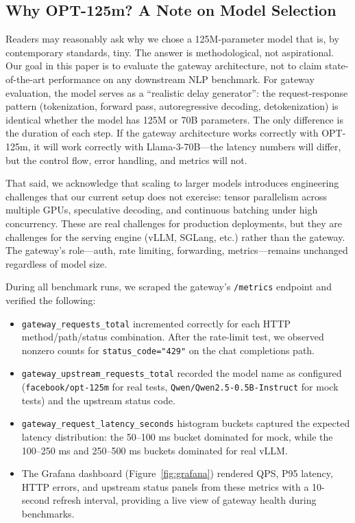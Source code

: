 \documentclass[10pt,journal]{IEEEtran}
\begin{document}
\subsection{Why OPT-125m? A Note on Model Selection}

Readers may reasonably ask why we chose a 125M-parameter model that is, by contemporary standards, tiny. The answer is methodological, not aspirational. Our goal in this paper is to evaluate the gateway architecture, not to claim state-of-the-art performance on any downstream NLP benchmark. For gateway evaluation, the model serves as a ``realistic delay generator'': the request-response pattern (tokenization, forward pass, autoregressive decoding, detokenization) is identical whether the model has 125M or 70B parameters. The only difference is the duration of each step. If the gateway architecture works correctly with OPT-125m, it will work correctly with Llama-3-70B---the latency numbers will differ, but the control flow, error handling, and metrics will not.

That said, we acknowledge that scaling to larger models introduces engineering challenges that our current setup does not exercise: tensor parallelism across multiple GPUs, speculative decoding, and continuous batching under high concurrency. These are real challenges for production deployments, but they are challenges for the serving engine (vLLM, SGLang, etc.) rather than the gateway. The gateway's role---auth, rate limiting, forwarding, metrics---remains unchanged regardless of model size.

During all benchmark runs, we scraped the gateway's \texttt{/metrics} endpoint and verified the following:

\begin{itemize}
  \item \texttt{gateway\_requests\_total} incremented correctly for each HTTP method/path/status combination. After the rate-limit test, we observed nonzero counts for \texttt{status\_code="429"} on the chat completions path.
  \item \texttt{gateway\_upstream\_requests\_total} recorded the model name as configured (\texttt{facebook/opt-125m} for real tests, \texttt{Qwen/Qwen2.5-0.5B-Instruct} for mock tests) and the upstream status code.
  \item \texttt{gateway\_request\_latency\_seconds} histogram buckets captured the expected latency distribution: the 50--100 ms bucket dominated for mock, while the 100--250 ms and 250--500 ms buckets dominated for real vLLM.
  \item The Grafana dashboard (Figure~\ref{fig:grafana}) rendered QPS, P95 latency, HTTP errors, and upstream status panels from these metrics with a 10-second refresh interval, providing a live view of gateway health during benchmarks.
\end{itemize}
\end{document}
